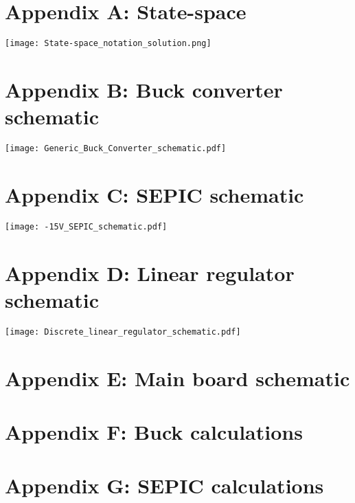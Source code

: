 \section*{Appendix A: State-space}


    \texttt{[image: State-space\_notation\_solution.png]}
\newpage
\newpage

\section*{Appendix B: Buck converter schematic} \label{Appendix_buck_schematic}
\texttt{[image: Generic\_Buck\_Converter\_schematic.pdf]}

\section*{Appendix C: SEPIC schematic} \label{Appendix_SEPIC_schematic}
\texttt{[image: -15V\_SEPIC\_schematic.pdf]}

\section*{Appendix D: Linear regulator schematic}\label{Appendix_lin_schematic}
\texttt{[image: Discrete\_linear\_regulator\_schematic.pdf]}

\section*{Appendix E: Main board schematic} \label{Appendix_main_schematic}


 \section*{Appendix F: Buck calculations} \label{Appendix_buck_calculations}
 

  \section*{Appendix G: SEPIC calculations} \label{Appendix_SEPIC_calculations}
  

